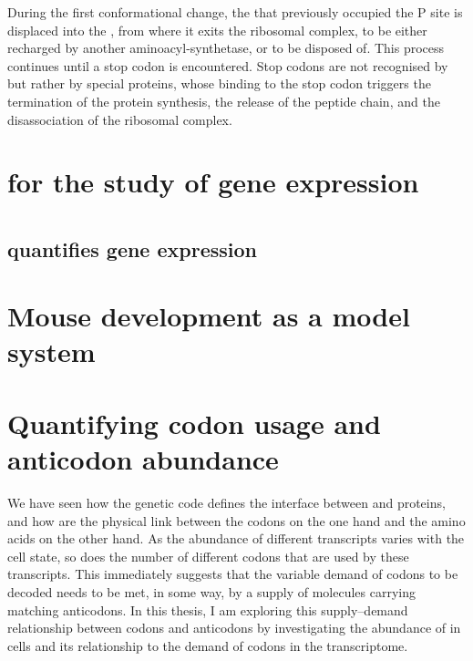 During the first conformational change, the \trna that previously occupied the P
site is displaced into the , from where it exits the ribosomal
complex, to be either recharged by another aminoacyl-\trna synthetase, or to be
disposed of. This process continues until a stop codon is encountered. Stop
codons are not recognised by \trna[s] but rather by special proteins, whose
binding to the stop codon triggers the termination of the protein synthesis, the
release of the peptide chain, and the disassociation of the ribosomal complex.


\section{ for the study of gene expression}

\section{}

\subsection{ quantifies  gene expression}

\section{Mouse development as a model system}

\section{Quantifying codon usage and anticodon abundance}

We have seen how the genetic code defines the interface between \mrna and
proteins, and how \trna[s] are the physical link between the codons on the one
hand and the amino acids on the other hand. As the abundance of different \mrna
transcripts varies with the cell state, so does the number of different codons
that are used by these transcripts. This immediately suggests that the variable
demand of codons to be decoded needs to be met, in some way, by a supply of
\trna molecules carrying matching anticodons. In this thesis, I am exploring
this supply--demand relationship between codons and anticodons by investigating
the abundance of \trna[s] in cells and its relationship to the demand of codons
in the \mrna transcriptome.

